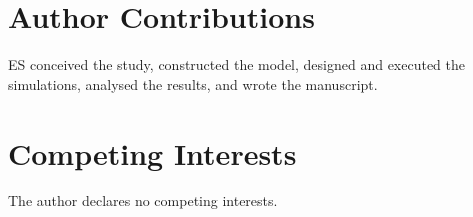 \documentclass[10pt,letterpaper]{article}
\begin{document}
\section*{Author Contributions}

ES conceived the study, constructed the model, designed and executed the
simulations, analysed the results, and wrote the manuscript.

\section*{Competing Interests}

The author declares no competing interests.



\end{document}
